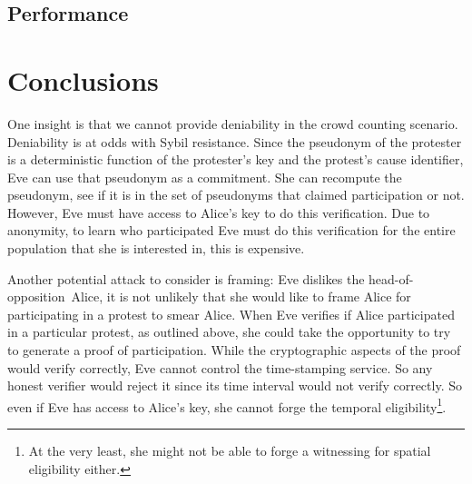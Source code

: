\subsection{Performance}%
\label{performance}




\section{Conclusions}


One insight is that we cannot provide deniability in the crowd counting 
scenario.
Deniability is at odds with Sybil resistance.
Since the pseudonym of the protester is a deterministic function of the 
protester's key and the protest's cause identifier, Eve can use that pseudonym 
as a commitment.
She can recompute the pseudonym, see if it is in the set of pseudonyms that 
claimed participation or not.
However, Eve must have access to Alice's key to do this verification.
Due to anonymity, to learn who participated Eve must do this verification for 
the entire population that she is interested in, this is expensive.

Another potential attack to consider is framing:
Eve dislikes the head-of-opposition~Alice, it is not unlikely that she would 
like to frame Alice for participating in a protest to smear Alice.
When Eve verifies if Alice participated in a particular protest, as outlined 
above, she could take the opportunity to try to generate a proof of 
participation.
While the cryptographic aspects of the proof would verify correctly, Eve cannot 
control the time-stamping service.
So any honest verifier would reject it since its time interval would not verify 
correctly.
So even if Eve has access to Alice's key, she cannot forge the temporal 
eligibility\footnote{%
  At the very least, she might not be able to forge a witnessing for spatial 
  eligibility either.
}.

